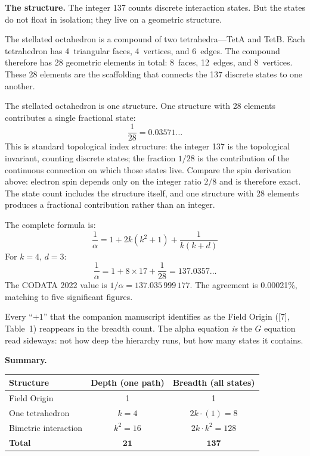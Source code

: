 \documentclass[11pt]{article}
\begin{document}
\textbf{The structure.}\quad
The integer 137 counts discrete interaction states.
But the states do not float in isolation; they live on a geometric structure.

The stellated octahedron is a compound of two tetrahedra---TetA and TetB.
Each tetrahedron has 4~triangular faces, 4~vertices, and 6~edges.
The compound therefore has 28 geometric elements in total: 8~faces, 12~edges, and 8~vertices.
These 28 elements are the scaffolding that connects the 137 discrete states to one another.

The stellated octahedron is one structure.
One structure with 28 elements contributes a single fractional state:
\begin{equation*}
\frac{1}{28} = 0.03571\ldots
\end{equation*}
This is standard topological index structure: the integer 137 is the topological invariant, counting discrete states; the fraction $1/28$ is the contribution of the continuous connection on which those states live.
Compare the spin derivation above: electron spin depends only on the integer ratio $2/8$ and is therefore exact.
The state count includes the structure itself, and one structure with 28 elements produces a fractional contribution rather than an integer.

The complete formula is:
%
\begin{equation}
\frac{1}{\alpha} = 1 + 2k(k^2 + 1) + \frac{1}{k(k + d)}
\label{eq:alpha-breadth}
\end{equation}
%
For $k = 4$, $d = 3$:
%
\begin{equation*}
\frac{1}{\alpha} = 1 + 8 \times 17 + \frac{1}{28} = 137.0357\ldots
\end{equation*}
%
The CODATA 2022 value is $1/\alpha = 137.035\,999\,177$.
The agreement is 0.00021\%, matching to five significant figures.

Every ``$+1$'' that the companion manuscript identifies as the Field Origin ([7], Table~1) reappears in the breadth count.
The alpha equation \emph{is} the $G$ equation read sideways: not how deep the hierarchy runs, but how many states it contains.

\textbf{Summary.}\quad

\begin{center}
\renewcommand{\arraystretch}{1.4}
\begin{tabular}{lcc}
\toprule
\textbf{Structure} & \textbf{Depth (one path)} & \textbf{Breadth (all states)} \\
\midrule
Field Origin & 1 & 1 \\
One tetrahedron & $k = 4$ & $2k \cdot (1) = 8$ \\
Bimetric interaction & $k^2 = 16$ & $2k \cdot k^2 = 128$ \\
\midrule
\textbf{Total} & $\mathbf{21}$ & $\mathbf{137}$ \\
\bottomrule
\end{tabular}
\end{center}
\end{document}
